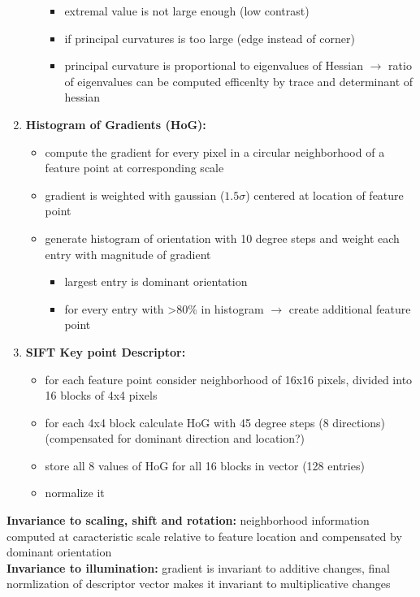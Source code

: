 \documentclass[11pt]{article}
\begin{document}
\begin{enumerate}
\begin{itemize}
\begin{itemize}
\item extremal value is not large enough (low contrast)
\item if principal curvatures is too large (edge instead of corner)
\item principal curvature is proportional to eigenvalues of Hessian 
$\rightarrow$ ratio of eigenvalues can be computed efficenlty by trace and
determinant of hessian
\end{itemize}
\end{itemize}
\item \textbf{Histogram of Gradients (HoG):}
\begin{itemize}
\item compute the gradient for every pixel in a circular neighborhood of a feature point
at corresponding scale
\item gradient is weighted with gaussian ($1.5\sigma$) centered at location of feature point
\item generate histogram of orientation with 10 degree steps and weight each entry with
magnitude of gradient
\begin{itemize}
\item largest entry is dominant orientation
\item for every entry with >80\% in histogram $\rightarrow$ create additional feature point
\end{itemize}
\end{itemize}
\item \textbf{SIFT Key point Descriptor:}
\begin{itemize}
\item for each feature point consider neighborhood of 16x16 pixels, divided into 16 blocks
of 4x4 pixels
\item for each 4x4 block calculate HoG with 45 degree steps (8 directions)
(compensated for dominant direction and location?)
\item store all 8 values of HoG for all 16 blocks in vector (128 entries)
\item normalize it
\end{itemize}
\end{enumerate}
\textbf{Invariance to scaling, shift and rotation:} neighborhood information computed at
caracteristic scale relative to feature location and compensated by dominant orientation\\
   \textbf{Invariance to illumination:} gradient is invariant to additive changes, final normlization
of descriptor vector makes it invariant to multiplicative changes
\end{document}

